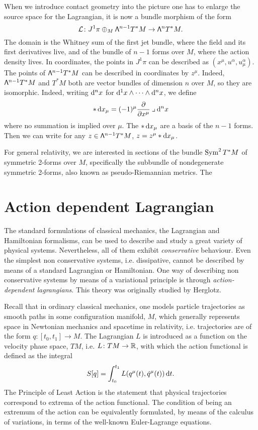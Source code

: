 \documentclass[../main.tex]{subfiles}
\begin{document}
When we introduce contact geometry into the picture one has to enlarge the source space
for the Lagrangian, it is now a bundle morphism of the form
\begin{equation*}
	\mathcal{L} \colon J^1\pi \oplus_M \mathsf{\Lambda}^{n-1}T^\ast M \to \mathsf{\Lambda}^{n} T^\ast M. 
\end{equation*}
The domain is the Whitney sum of the first jet bundle, where the field and its first
derivatives live, and of the bundle of \( n-1 \) forms over \( M \), where the action
density lives. In coordinates, the points in \( J^1\pi \) can be described as \( (x^\mu,
u^\alpha, u^\alpha_\mu) \). The points of \( \mathsf{\Lambda}^{n-1}T^\ast M \) can be described in
coordinates by \( z^\mu \). Indeed, \( \mathsf{\Lambda}^{n-1} T^\ast M \) and \( T^\ast M \) both are
vector bundles of dimension \( n \) over \( M \), so they are isomorphic. Indeed, writing
\( \mathrm{d}^n x \) for \( \mathrm{d}^1x \wedge \cdots \wedge \mathrm{d}^n x \), we define
\begin{equation*}
	\ast \,\mathrm{d} x_\mu = (-1)^\mu \frac{\partial}{\partial x^\mu} \mathbin{\lrcorner} \mathrm{d}^n x
\end{equation*}
where no summation is implied over \( \mu \). The \( \ast \,\mathrm{d} x_\mu \) are a basis of the
\( n-1 \) forms. Then we can write for any \( z \in \mathsf{\Lambda}^{n-1} T^\ast M \), \( z = z^\mu
\ast \mathrm{d} x_\mu \). 

For general relativity, we are interested in sections of the bundle \( \operatorname{Sym}^2 T^\ast M \)
of symmetric 2-forms over \( M \), specifically the subbundle of nondegenerate symmetric
2-forms, also known as pseudo-Riemannian metrics. The 

\section{Action dependent Lagrangian}
The standard formulations of classical mechanics, the Lagrangian and Hamiltonian
formalisms, can be used to describe and study a great variety of physical systems.
Nevertheless, all of them exhibit \emph{conservative} behaviour. Even the simplest non
conservative systems, i.e. dissipative, cannot be described by means of a standard Lagrangian or
Hamiltonian. One way of describing non conservative systems by means of a variational
principle is through \emph{action-dependent lagrangians}. This theory was originally
studied by Herglotz.

Recall that in ordinary classical mechanics, one models particle trajectories as
smooth paths in some configuration manifold, \( M \), which generally represents space in
Newtonian mechanics and spacetime in relativity, i.e. trajectories are of the
form \( q \colon [t_0, t_1] \to M \). The Lagrangian \( L \) is introduced as a function on the
velocity phase space, \( TM \), i.e. \( L \colon TM \to \mathbb{R} \), with which the action
functional is defined as the integral
\begin{equation*}
	S[q] = \int_{t_0}^{t_1} L(q^\mu(t) , \dot{q}^\mu(t)) \,\mathrm{d} t. 
\end{equation*}
The Principle of Least Action is the statement that physical trajectories correspond to
extrema of the action functional. The condition of being an extremum of the action can be
equivalently formulated, by means of the calculus of variations, in terms of the
well-known Euler-Lagrange equations. 
\end{document}
